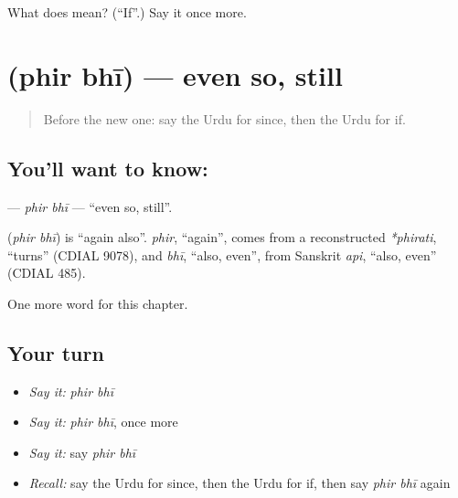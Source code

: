 \begin{tcolorbox}[breakable,colback=teal!4,colframe=teal!35!black,title={Before you move on}]
What does  mean? (\textquotedblleft{}If\textquotedblright{}.) Say it once more.
\end{tcolorbox}
\section[\texorpdfstring{\ur{پھر} \ur{بھی} (phir bhī)}{پھر بھی (phir bhī)}]{  (phir bhī) — even so, still}

\label{lesson:UR-C159-phir-bhi}



\begin{quote}
Before the new one: say the Urdu for since, then the Urdu for if.
\end{quote}

\subsection*{You'll want to know:  }
\textbf{ } — \emph{phir bhī} — \textquotedblleft{}even so, still\textquotedblright{}.

\begin{cousinweb}
\textbf{ } (\emph{phir bhī}) is \textquotedblleft{}again also\textquotedblright{}. \emph{phir}, \textquotedblleft{}again\textquotedblright{}, comes from a reconstructed \emph{*phirati}, \textquotedblleft{}turns\textquotedblright{} (CDIAL 9078), and \emph{bhī}, \textquotedblleft{}also, even\textquotedblright{}, from Sanskrit \emph{api}, \textquotedblleft{}also, even\textquotedblright{} (CDIAL 485).
\end{cousinweb}

\begin{grammarlens}[title={What you've built}]
One more word for this chapter.
\end{grammarlens}

\subsection*{Your turn}
\begin{itemize}
\raggedright
  \item \emph{Say it:} \emph{phir bhī}
  \item \emph{Say it:} \emph{phir bhī}, once more
  \item \emph{Say it:} say \emph{phir bhī}
  \item \emph{Recall:} say the Urdu for since, then the Urdu for if, then say \emph{phir bhī} again
\end{itemize}

